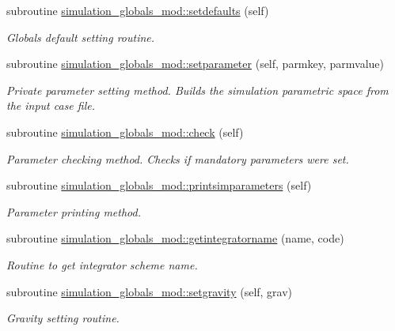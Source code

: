\begin{DoxyCompactItemize}
\item 
subroutine \mbox{\hyperlink{namespacesimulation__globals__mod_ac2ac06271de377004c67b6ba2f3ed353}{simulation\+\_\+globals\+\_\+mod\+::setdefaults}} (self)
\begin{DoxyCompactList}\small\item\em Globals default setting routine. \end{DoxyCompactList}\item 
subroutine \mbox{\hyperlink{namespacesimulation__globals__mod_a8a05831d4c3e3eb5741d65978f6fcf61}{simulation\+\_\+globals\+\_\+mod\+::setparameter}} (self, parmkey, parmvalue)
\begin{DoxyCompactList}\small\item\em Private parameter setting method. Builds the simulation parametric space from the input case file. \end{DoxyCompactList}\item 
subroutine \mbox{\hyperlink{namespacesimulation__globals__mod_a41249abb5c33ef9e8bff448f0b3826fa}{simulation\+\_\+globals\+\_\+mod\+::check}} (self)
\begin{DoxyCompactList}\small\item\em Parameter checking method. Checks if mandatory parameters were set. \end{DoxyCompactList}\item 
subroutine \mbox{\hyperlink{namespacesimulation__globals__mod_a97c04d0289a9f2d004a9329cb7ab16f0}{simulation\+\_\+globals\+\_\+mod\+::printsimparameters}} (self)
\begin{DoxyCompactList}\small\item\em Parameter printing method. \end{DoxyCompactList}\item 
subroutine \mbox{\hyperlink{namespacesimulation__globals__mod_a68e871ed8e5d3930884e968c6fdafddc}{simulation\+\_\+globals\+\_\+mod\+::getintegratorname}} (name, code)
\begin{DoxyCompactList}\small\item\em Routine to get integrator scheme name. \end{DoxyCompactList}\item 
subroutine \mbox{\hyperlink{namespacesimulation__globals__mod_a9e92dfed4ef7388208adce768f064554}{simulation\+\_\+globals\+\_\+mod\+::setgravity}} (self, grav)
\begin{DoxyCompactList}\small\item\em Gravity setting routine. \end{DoxyCompactList}\item 

\end{DoxyCompactItemize}
